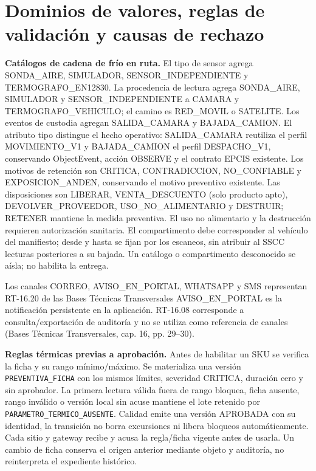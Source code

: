 \section{Dominios de valores, reglas de validación y causas de rechazo}
\label{anexo-5c}

\textbf{Catálogos de cadena de frío en ruta.} El tipo de sensor agrega SONDA\_AIRE, SIMULADOR, SENSOR\_INDEPENDIENTE y TERMOGRAFO\_EN12830. La procedencia de lectura agrega SONDA\_AIRE, SIMULADOR y SENSOR\_INDEPENDIENTE a CAMARA y TERMOGRAFO\_VEHICULO; el camino es RED\_MOVIL o SATELITE. Los eventos de custodia agregan SALIDA\_CAMARA y BAJADA\_CAMION. El atributo tipo distingue el hecho operativo: SALIDA\_CAMARA reutiliza el perfil MOVIMIENTO\_V1 y BAJADA\_CAMION el perfil DESPACHO\_V1, conservando ObjectEvent, acción OBSERVE y el contrato EPCIS existente. Los motivos de retención son CRITICA, CONTRADICCION, NO\_CONFIABLE y EXPOSICION\_ANDEN, conservando el motivo preventivo existente. Las disposiciones son LIBERAR, VENTA\_DESCUENTO (solo producto apto), DEVOLVER\_PROVEEDOR, USO\_NO\_ALIMENTARIO y DESTRUIR; RETENER mantiene la medida preventiva. El uso no alimentario y la destrucción requieren autorización sanitaria. El compartimento debe corresponder al vehículo del manifiesto; desde y hasta se fijan por los escaneos, sin atribuir al SSCC lecturas posteriores a su bajada. Un catálogo o compartimento desconocido se aísla; no habilita la entrega.

Los canales CORREO, AVISO\_EN\_PORTAL, WHATSAPP y SMS representan RT-16.20 de las Bases Técnicas Transversales AVISO\_EN\_PORTAL es la notificación persistente en la aplicación. RT-16.08 corresponde a consulta/exportación de auditoría y no se utiliza como referencia de canales (Bases Técnicas Transversales, cap. 16, pp. 29–30).

\textbf{Reglas térmicas previas a aprobación.} Antes de habilitar un SKU se verifica la ficha y su rango mínimo/máximo. Se materializa una versión \texttt{PREVENTIVA\_\allowbreak{}FICHA} con los mismos límites, severidad CRITICA, duración cero y sin aprobador. La primera lectura válida fuera de rango bloquea, ficha ausente, rango inválido o versión local sin acuse mantiene el lote retenido por \texttt{PARAMETRO\_\allowbreak{}TERMICO\_\allowbreak{}AUSENTE}. Calidad emite una versión APROBADA con su identidad, la transición no borra excursiones ni libera bloqueos automáticamente. Cada sitio y gateway recibe y acusa la regla/ficha vigente antes de usarla. Un cambio de ficha conserva el origen anterior mediante objeto y auditoría, no reinterpreta el expediente histórico.

